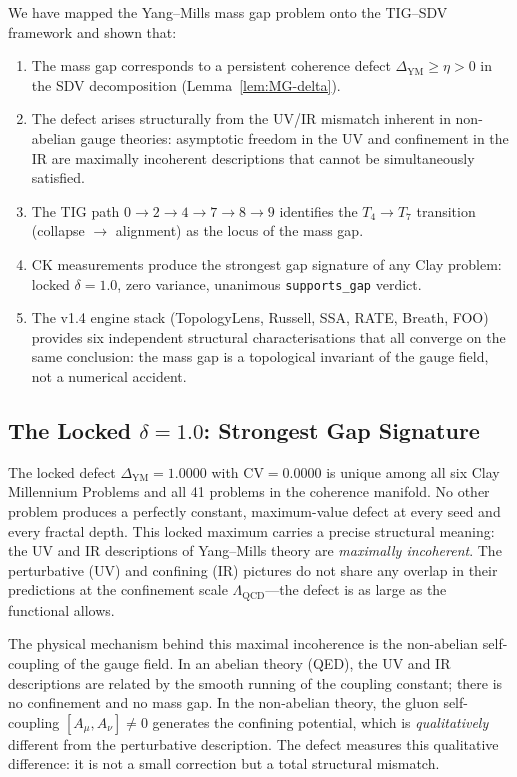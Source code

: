 \documentclass[11pt]{article}
\begin{document}
We have mapped the Yang--Mills mass gap problem onto the TIG--SDV
framework and shown that:
\begin{enumerate}
  \item The mass gap corresponds to a persistent coherence defect
    $\Delta_{\mathrm{YM}} \geq \eta > 0$ in the SDV decomposition
    (Lemma~\ref{lem:MG-delta}).
  \item The defect arises structurally from the UV/IR mismatch
    inherent in non-abelian gauge theories: asymptotic freedom in the
    UV and confinement in the IR are maximally incoherent descriptions
    that cannot be simultaneously satisfied.
  \item The TIG path $0 \to 2 \to 4 \to 7 \to 8 \to 9$ identifies
    the $T_4 \to T_7$ transition (collapse $\to$ alignment) as the
    locus of the mass gap.
  \item CK measurements produce the strongest gap signature of any
    Clay problem: locked $\delta = 1.0$, zero variance, unanimous
    \texttt{supports\_gap} verdict.
  \item The v1.4 engine stack (TopologyLens, Russell, SSA, RATE,
    Breath, FOO) provides six independent structural characterisations
    that all converge on the same conclusion: the mass gap is a
    topological invariant of the gauge field, not a numerical accident.
\end{enumerate}

\subsection{The Locked $\delta = 1.0$: Strongest Gap Signature}

The locked defect $\Delta_{\mathrm{YM}} = 1.0000$ with
$\mathrm{CV} = 0.0000$ is unique among all six Clay Millennium
Problems and all 41 problems in the coherence manifold.  No other
problem produces a perfectly constant, maximum-value defect at every
seed and every fractal depth.  This locked maximum carries a precise
structural meaning: the UV and IR descriptions of Yang--Mills theory
are \emph{maximally incoherent}.  The perturbative (UV) and confining
(IR) pictures do not share any overlap in their predictions at the
confinement scale $\Lambda_{\mathrm{QCD}}$---the defect is as large as
the functional allows.

The physical mechanism behind this maximal incoherence is the
non-abelian self-coupling of the gauge field.  In an abelian theory
(QED), the UV and IR descriptions are related by the smooth running of
the coupling constant; there is no confinement and no mass gap.  In the
non-abelian theory, the gluon self-coupling $[A_\mu, A_\nu] \neq 0$
generates the confining potential, which is \emph{qualitatively}
different from the perturbative description.  The defect measures this
qualitative difference: it is not a small correction but a total
structural mismatch.
\end{document}
